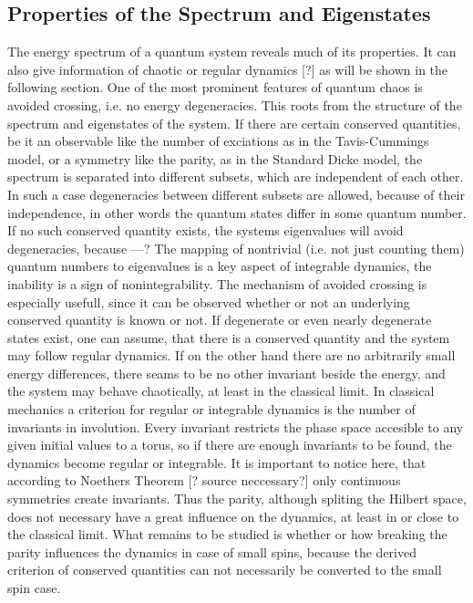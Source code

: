 \subsection{Properties of the Spectrum and Eigenstates}
The energy spectrum of a quantum system reveals much of its properties.
It can also give information of chaotic or regular dynamics [?] as will be shown in the following section.
One of the most prominent features of quantum chaos is avoided crossing, i.e. no energy degeneracies.
This roots from the structure of the spectrum and eigenstates of the system.
If there are certain conserved quantities, be it an observable like the number of exciations as in the Tavis-Cummings model, or a symmetry like the parity, as in the Standard Dicke model, the spectrum is separated into different subsets, which are independent of each other.
In such a case degeneracies between different subsets are allowed, because of their independence, in other words the quantum states differ in some quantum number. 
If no such conserved quantity exists, the systems eigenvalues will avoid degeneracies, because ---?
The mapping of nontrivial (i.e. not just counting them) quantum numbers to eigenvalues is a key aspect of integrable dynamics, the inability is a sign of nonintegrability.
The mechanism of avoided crossing is especially usefull, since it can be observed whether or not an underlying conserved quantity is known or not. 
If degenerate or even nearly degenerate states exist, one can assume, that there is a conserved quantity and the system may follow regular dynamics.
If on the other hand there are no arbitrarily small energy differences, there seams to be no other invariant beside the energy, and the system may behave chaotically, at least in the classical limit.
In classical mechanics a criterion for regular or integrable dynamics is the number of invariants in involution.
Every invariant restricts the phase space accesible to any given initial values to a torus, so if there are enough invariants to be found, the dynamics become regular or integrable.
It is important to notice here, that according to Noethers Theorem [? source neccessary?] only continuous symmetries create invariants. 
Thus the parity, although spliting the Hilbert space, does not necessary have a great influence on the dynamics, at least in or close to the classical limit.
What remains to be studied is whether or how breaking the parity influences the dynamics in case of small spins, because the derived criterion of conserved quantities can not necessarily be converted to the small spin case.


